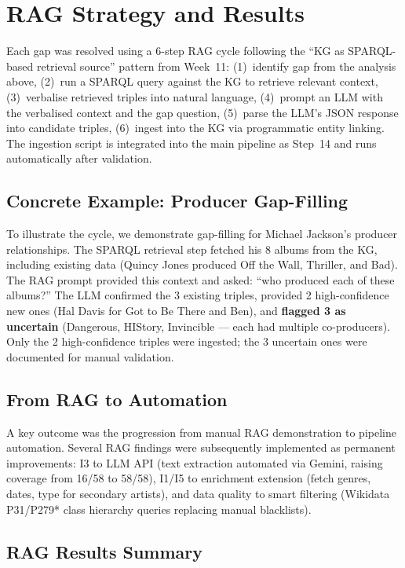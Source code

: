 \documentclass[11pt,a4paper]{article}
\begin{document}
\section{RAG Strategy and Results}

Each gap was resolved using a 6-step RAG cycle following the ``KG as SPARQL-based retrieval source'' pattern from Week~11: (1)~identify gap from the analysis above, (2)~run a SPARQL query against the KG to retrieve relevant context, (3)~verbalise retrieved triples into natural language, (4)~prompt an LLM with the verbalised context and the gap question, (5)~parse the LLM's JSON response into candidate triples, (6)~ingest into the KG via programmatic entity linking. The ingestion script is integrated into the main pipeline as Step~14 and runs automatically after validation.

\subsection{Concrete Example: Producer Gap-Filling}

To illustrate the cycle, we demonstrate gap-filling for Michael Jackson's producer relationships. The SPARQL retrieval step fetched his 8 albums from the KG, including existing data (Quincy Jones produced Off the Wall, Thriller, and Bad). The RAG prompt provided this context and asked: ``who produced each of these albums?'' The LLM confirmed the 3 existing triples, provided 2 high-confidence new ones (Hal Davis for Got to Be There and Ben), and \textbf{flagged 3 as uncertain} (Dangerous, HIStory, Invincible --- each had multiple co-producers). Only the 2 high-confidence triples were ingested; the 3 uncertain ones were documented for manual validation.

\subsection{From RAG to Automation}

A key outcome was the progression from manual RAG demonstration to pipeline automation. Several RAG findings were subsequently implemented as permanent improvements: I3 to LLM API (text extraction automated via Gemini, raising coverage from 16/58 to 58/58), I1/I5 to enrichment extension (fetch genres, dates, type for secondary artists), and data quality to smart filtering (Wikidata P31/P279* class hierarchy queries replacing manual blacklists).

\subsection{RAG Results Summary}
\end{document}
